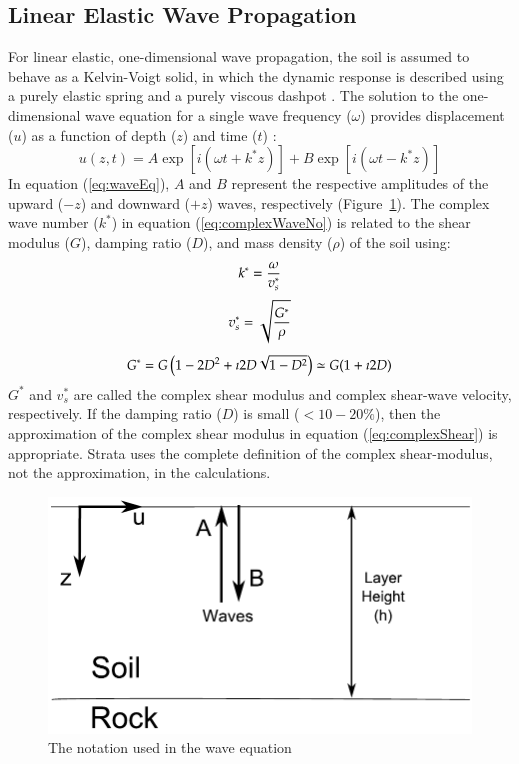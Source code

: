 \documentclass[11pt]{report}
\begin{document}
\subsection{Linear Elastic Wave Propagation}\label{ch:siteResponse:wavePropagation}
For linear elastic, one-dimensional wave propagation, the soil is assumed to behave as a
Kelvin-Voigt solid, in which the dynamic response is described using a purely elastic spring and a
purely viscous dashpot \citep{kramer:96}.  The solution to the one-dimensional wave equation for a single wave frequency ($\omega$) provides displacement ($u$) as a function of depth
($z$) and time ($t$) \citep{kramer96}:
\begin{equation}
  u(z,t) = A\exp\left[i\left( \omega t + k^* z \right)\right] + B\exp\left[i\left( \omega t - k^* z
  \right)\right] 
  \label{eq:waveEq}
\end{equation}
In equation (\ref{eq:waveEq}), $A$ and $B$ represent the respective amplitudes of the upward ($-z$)
and downward ($+z$) waves, respectively (Figure~\ref{fig:siteResponse:simpleWave}).  The complex wave number
($k^*$) in equation (\ref{eq:complexWaveNo}) is related to the shear modulus ($G$), damping ratio
($D$), and mass density ($\rho$) of the soil using:
\begin{equation}
  k^* 	= \frac{\omega}{v_s^*} \\
  \label{eq:complexWaveNo}
\end{equation}
\begin{equation}
  v_s^*	= \sqrt{ \frac{G^*}{\rho} } \\
\end{equation}
\begin{equation}
  G^* 	= G \left( 1 - 2D^2 + \imath 2 D \sqrt{ 1 - D^2 }\right) 
  \simeq G ( 1 + \imath 2 D ) \\
  \label{eq:complexShear}
\end{equation}
$G^*$ and $v_s^*$ are called the complex shear modulus and complex
shear-wave velocity, respectively.  If the damping ratio ($D$) is small ($<10-20\%$), then the
approximation of the complex shear modulus in equation (\ref{eq:complexShear}) is appropriate.  Strata
uses the complete definition of the complex shear-modulus, not the approximation, in the
calculations.

\begin{figure}[tb]
  \begin{center}
	\includegraphics[width=0.7\linewidth]{figures/siteResponse/simpleWave.pdf}
  \end{center}
  \caption{The notation used in the wave equation}
  \label{fig:siteResponse:simpleWave}
\end{figure}
\end{document}
